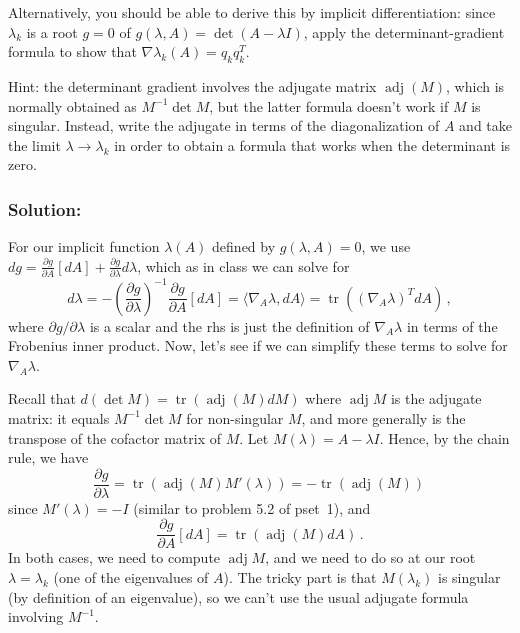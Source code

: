 \documentclass[10pt,oneside]{article}
\newcommand{\tr}{\operatorname{tr}}
\newcommand{\adj}{\operatorname{adj}}
\begin{document}
Alternatively, you should be able to derive this by implicit differentiation: since $\lambda_k$ is a root $g=0$ of $g(\lambda,A) = \det(A - \lambda I)$, apply the determinant-gradient formula to show that $\nabla \lambda_k(A) = q_k q_k^T$.

Hint: the determinant gradient involves the adjugate matrix $\operatorname{adj}(M)$, which is normally obtained as $M^{-1} \det M$, but the latter formula doesn't work if $M$ is singular.  Instead, write the adjugate in terms of the diagonalization of $A$ and take the limit $\lambda \to \lambda_k$ in order to obtain a formula that works when the determinant is zero.

\subsubsection*{Solution:}

For our implicit function $\lambda(A)$ defined by $g(\lambda,A) = 0$, we use $dg = \frac{\partial g}{\partial A}[dA] + \frac{\partial g}{\partial \lambda} d\lambda$, which as in class we can solve for
$$
d\lambda = -\left(\frac{\partial g}{\partial \lambda}\right)^{-1} \frac{\partial g}{\partial A}[dA] = \langle \nabla_A \lambda, dA \rangle = \tr((\nabla_A \lambda)^T dA) \, ,
$$
where $\partial g/\partial \lambda$ is a scalar and the rhs is just the definition of $\nabla_A \lambda$ in terms of the Frobenius inner product.  Now, let's see if we can simplify these terms to solve for $\nabla_A \lambda$.

Recall that $d(\det M) = \tr(\adj(M) dM)$ where $\adj M$ is the adjugate matrix: it equals $M^{-1} \det M$ for non-singular $M$, and more generally is the transpose of the cofactor matrix of $M$.  Let $M(\lambda) = A - \lambda I$.  Hence, by the chain rule, we have
$$
\frac{\partial g}{\partial \lambda} = \tr(\adj(M) M'(\lambda) ) = -\tr(\adj(M)) \,
$$
since $M'(\lambda) = -I$ (similar to problem 5.2 of pset~1), and
$$
\frac{\partial g}{\partial A}[dA] = \tr(\adj(M) dA ) \, .
$$
In both cases, we need to compute $\adj M$, and we need to do so at our root $\lambda = \lambda_k$ (one of the eigenvalues of $A$).   The tricky part is that $M(\lambda_k)$ is singular (by definition of an eigenvalue), so we can't use the usual adjugate formula involving $M^{-1}$.
\end{document}
